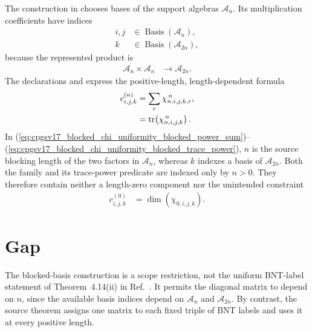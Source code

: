 \documentclass{article}
\begin{document}
The construction in
 chooses bases of the support
algebras $\mathcal A_n$. Its multiplication coefficients have indices
\begin{align}
    i,j &\in \operatorname{Basis}(\mathcal A_n),
\label{eq:cpgsv17_blocked_chi_uniformity_blocked_source_indices}\\
    k &\in \operatorname{Basis}(\mathcal A_{2n}),
\label{eq:cpgsv17_blocked_chi_uniformity_blocked_target_index}
\end{align}
because the represented product is
\begin{align}
    \mathcal A_n\times\mathcal A_n
        &\longrightarrow \mathcal A_{2n}.
\label{eq:cpgsv17_blocked_chi_uniformity_blocked_product}
\end{align}
The declarations
 and
express the positive-length, length-dependent formula
\begin{align}
    c^{(n)}_{i,j,k}
        &= \sum_r \chi_{n,i,j,k,r}^{\,n},
\label{eq:cpgsv17_blocked_chi_uniformity_blocked_power_sum}\\
        &= \operatorname{tr}\!\left(\chi_{n,i,j,k}^{\,n}\right).
\label{eq:cpgsv17_blocked_chi_uniformity_blocked_trace_power}
\end{align}
In
(\ref{eq:cpgsv17_blocked_chi_uniformity_blocked_power_sum})--%
(\ref{eq:cpgsv17_blocked_chi_uniformity_blocked_trace_power}), $n$ is the
source blocking length of the two factors in $\mathcal A_n$, whereas $k$
indexes a basis of $\mathcal A_{2n}$. Both the family and its trace-power
predicate are indexed only by $n>0$. They therefore contain neither a
length-zero component nor the unintended constraint
\begin{align}
    c^{(0)}_{i,j,k}
        &= \dim\!\left(\chi_{0,i,j,k}\right).
\label{eq:cpgsv17_blocked_chi_uniformity_excluded_zero_length}
\end{align}

\section{Gap}

The blocked-basis construction is a scope restriction, not the uniform
BNT-label statement of Theorem~4.14(ii) in
Ref.~\cite{Cirac2016MPDO_arXiv}. It permits the diagonal matrix to depend on
$n$, since the available basis indices depend on $\mathcal A_n$ and
$\mathcal A_{2n}$. By contrast, the source theorem assigns one matrix to each
fixed triple of BNT labels and uses it at every positive length.
\end{document}
